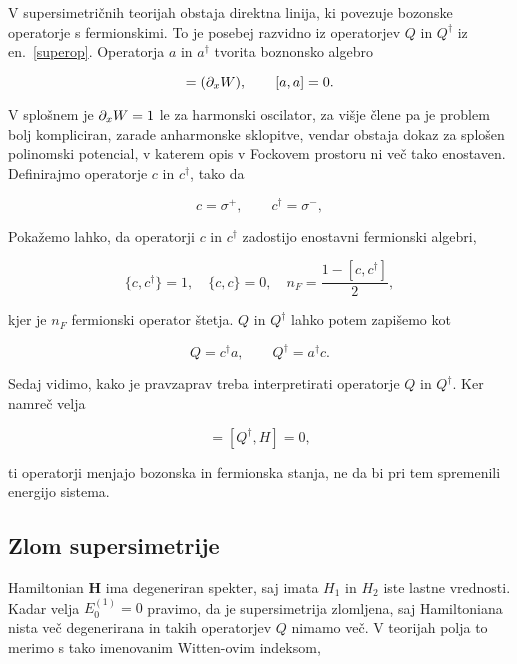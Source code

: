 V supersimetri\v cnih teorijah obstaja direktna linija, ki povezuje bozonske operatorje s fermionskimi.
To je posebej razvidno iz operatorjev $Q$ in $Q^\dagger$ iz en.~\eqref{superop}. Operatorja
$a$ in $a^\dagger$ tvorita boznonsko algebro

\begin{equation}
	[a, a^\dagger] = (\px W), \qquad [a, a] = 0.
\end{equation}

\ni V splo\v snem je $\partial_x W = 1$ le za harmonski oscilator, za vi\v sje \v clene pa je problem bolj
kompliciran, zarade anharmonske sklopitve, vendar obstaja dokaz za splo\v sen polinomski potencial, v katerem
opis v Fockovem prostoru ni ve\v c tako enostaven. Definirajmo operatorje $c$ in $c^\dagger$, tako da

\begin{equation}
	c = \sigma^+, \qquad c^\dagger = \sigma^-,
\end{equation}

\ni Poka\v zemo lahko, da operatorji $c$ in $c^\dagger$ zadostijo enostavni fermionski algebri,

\begin{equation}
	\{c, c^\dagger\} = 1, \quad \{c, c\} = 0, \quad n_F = \frac{1 - [c,c^\dagger]}{2},
\end{equation}

\ni kjer je $n_F$ fermionski operator \v stetja. $Q$ in $Q^\dagger$ lahko potem zapi\v semo kot

\begin{equation}
	Q = c^\dagger a, \qquad Q^\dagger = a^\dagger c.
\end{equation}

\ni Sedaj vidimo, kako je pravzaprav treba interpretirati operatorje $Q$ in $Q^\dagger$. Ker namre\v c
velja

\begin{equation}
	[Q, H] = [Q^\dagger, H] = 0,
\end{equation}

\ni ti operatorji menjajo bozonska in fermionska stanja, ne da bi pri tem spremenili energijo sistema.

\subsection{Zlom supersimetrije}

Hamiltonian $\mathbf{H}$ ima degeneriran spekter, saj imata $H_1$ in $H_2$ iste lastne vrednosti. Kadar velja
$E^{(1)}_0 = 0$ pravimo, da je supersimetrija zlomljena, saj Hamiltoniana nista ve\v c degenerirana
in takih operatorjev $Q$ nimamo ve\v c. V teorijah polja to merimo s tako imenovanim Witten-ovim
indeksom,

